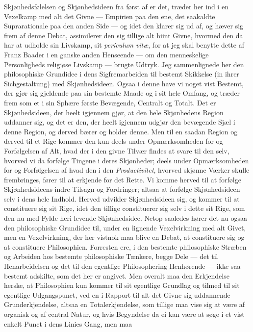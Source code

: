 \documentclass[12pt,a4paper]{book}
\newcommand{\apage}[1]{\marginnote{\footnotesize\textit{[#1]}}}
\begin{document}
Skjønhedsfølelsen og Skjønhedsideen fra først af er det, træder her ind
i en Vexelkamp med alt det Givne --- Empirien paa den ene, det
saakaldte Suprarationale paa den anden Side --- og idet den klarer sig
ud af, og hæver sig frem af denne Debat, assimilerer den sig tillige
alt hiint Givne, hvormed den da har at udholde sin Livskamp, sit
\textit{periculum vitæ}, for at jeg skal benytte dette af Franz Baader
i en ganske anden Henseende --- om den menneskelige \apage{46} Personligheds
religiøse Livskamp --- brugte Udtryk. Jeg sammenlignede her den
philosophiske Grundidee i dens Sigfremarbeiden til bestemt Skikkelse
(in ihrer Sichgestaltung) med Skjønhedsideen. Ogsaa i denne have vi
noget vist Bestemt, der gjør sig gjeldende paa sin bestemte Maade og i
sit hele Omfang, og træder frem som et i sin Sphære første Bevægende,
Centralt og Totalt. Det er Skjønhedsideen, der heelt igjennem gjør, at
den hele Skjønhedens Region uddanner sig, og det er den, der heelt
igjennem udgjør den bevægende Sjæl i denne Region, og derved bærer og
holder denne. Men til en saadan Region og derved til et Rige kommer
den kun deels under Opmærksomheden for og Forfølgelsen af Alt, hvad der
i den givne Tilvær findes at svare til den selv, hvorved vi da forfølge
Tingene i deres Skjønheder; deels under Opmærksomheden for og
Forfølgelsen af hvad den i den \emph{Productivitet}, hvorved skjønne Værker
skulle frembringes, fører til at erkjende for det Rette. Vi komme
herved til at forfølge Skjønhedsideens indre Tilsagn og Fordringer;
altsaa at forfølge Skjønhedsideen selv i dens hele Indhold. Herved
udvikler Skjønhedsideen sig, og kommer til at constituere sig sit Rige,
idet den tillige constituerer sig selv i dette sit Rige, som den nu med
Fylde heri levende Skjønhedsidee. Netop saaledes hører det nu ogsaa den
philosophiske Grundidee til, under en lignende Vexelvirkning med alt
Givet, men en Vexelvirkning, der her vistnok maa blive en Debat, at
constituere sig og at constituere Philosophien. Forresten ere, i den
bestemte philosophiske Stræben og Arbeiden hos bestemte philosophiske
Tænkere, begge Dele --- det til Henarbeidelsen og det til den egentlige
Philosophering Henhørende --- ikke saa bestemt adskilte, som det her er
angivet. Men overalt maa den Erkjendelse herske, at Philosophien kun
kommer til sit egentlige Grundlag og tilmed til sit egentlige
Udgangspunct, ved en i Rapport til alt det Givne sig uddannende
Grunderkjendelse, altsaa en Totalerkjendelse, som tillige maa vise sig
at være af organisk og af central Natur, og hvis Begyndelse da ei kan
\apage{47} være at søge i et vist enkelt Punct i dens Linies Gang, men maa
\end{document}
